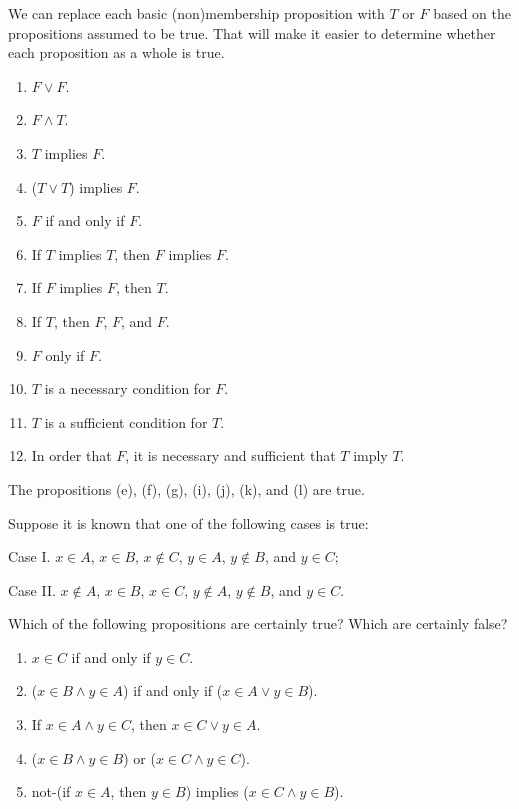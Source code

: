 \begin{solution}
We can replace each basic (non)membership proposition with $T$ or $F$ based on
the propositions assumed to be true. That will make it easier to determine whether
each proposition as a whole is true.
\begin{enumerate}[label=(\alph*)]
    \item $F\lor F$.
    \item $F\land T$.
    \item $T$ implies $F$.
    \item ($T\lor T$) implies $F$.
    \item $F$ if and only if $F$.
    \item If $T$ implies $T$, then $F$ implies $F$.
    \item If $F$ implies $F$, then $T$.
    \item If $T$, then $F$, $F$, and $F$.
    \item $F$ only if $F$.
    \item $T$ is a necessary condition for $F$.
    \item $T$ is a sufficient condition for $T$.
    \item In order that $F$, it is necessary and sufficient that $T$ imply $T$.
\end{enumerate}
The propositions (e), (f), (g), (i), (j), (k), and (l) are true.
\end{solution}

\begin{exercise}
Suppose it is known that one of the following cases is true:

Case I. $x\in A$, $x\in B$, $x\nin C$, $y\in A$, $y\nin B$, and $y\in C$;

Case II. $x\nin A$, $x\in B$, $x\in C$, $y\nin A$, $y\nin B$, and $y\in C$.

Which of the following propositions are certainly true? Which are certainly false?

\begin{enumerate}[label=(\alph*)]
    \item $x\in C$ if and only if $y\in C$.
    \item ($x\in B\land y\in A$) if and only if ($x\in A\lor y\in B$).
    \item If $x\in A\land y\in C$, then $x\in C\lor y\in A$.
    \item ($x\in B\land y\in B$) or ($x\in C\land y\in C$).
    \item not-(if $x\in A$, then $y\in B$) implies ($x\in C\land y\in B$).
\end{enumerate}
\end{exercise}

